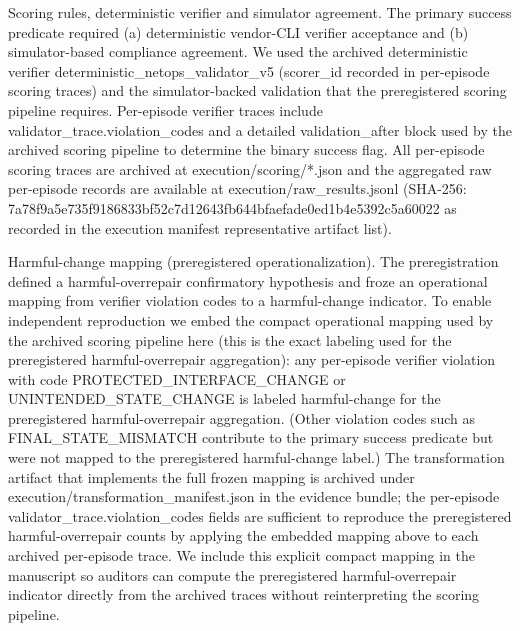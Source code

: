 \documentclass[conference]{IEEEtran}
\begin{document}
Scoring rules, deterministic verifier and simulator agreement. The primary success predicate required (a) deterministic vendor-CLI verifier acceptance and (b) simulator-based compliance agreement. We used the archived deterministic verifier deterministic\_netops\_validator\_v5 (scorer\_id recorded in per-episode scoring traces) and the simulator-backed validation that the preregistered scoring pipeline requires. Per-episode verifier traces include validator\_trace.violation\_codes and a detailed validation\_after block used by the archived scoring pipeline to determine the binary success flag. All per-episode scoring traces are archived at execution/scoring/*.json and the aggregated raw per-episode records are available at execution/raw\_results.jsonl (SHA-256: 7a78f9a5\allowbreak{}e735f918\allowbreak{}6833bf52\allowbreak{}c7d12643\allowbreak{}fb644bfa\allowbreak{}efade0ed\allowbreak{}1b4e5392\allowbreak{}c5a60022 as recorded in the execution manifest representative artifact list).

Harmful-change mapping (preregistered operationalization). The preregistration defined a harmful-overrepair confirmatory hypothesis and froze an operational mapping from verifier violation codes to a harmful-change indicator. To enable independent reproduction we embed the compact operational mapping used by the archived scoring pipeline here (this is the exact labeling used for the preregistered harmful-overrepair aggregation): any per-episode verifier violation with code PROTECTED\_INTERFACE\_CHANGE or UNINTENDED\_STATE\_CHANGE is labeled harmful-change for the preregistered harmful-overrepair aggregation. (Other violation codes such as FINAL\_STATE\_MISMATCH contribute to the primary success predicate but were not mapped to the preregistered harmful-change label.) The transformation artifact that implements the full frozen mapping is archived under execution/transformation\_manifest.json in the evidence bundle; the per-episode validator\_trace.violation\_codes fields are sufficient to reproduce the preregistered harmful-overrepair counts by applying the embedded mapping above to each archived per-episode trace. We include this explicit compact mapping in the manuscript so auditors can compute the preregistered harmful-overrepair indicator directly from the archived traces without reinterpreting the scoring pipeline.
\end{document}
